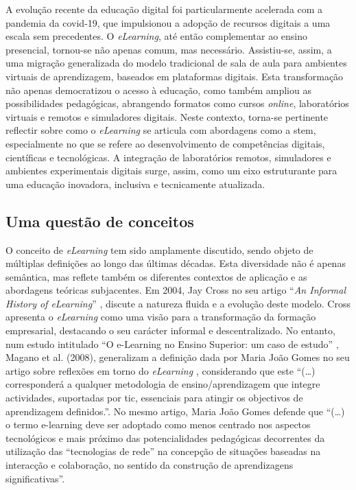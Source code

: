 A evolução recente da educação digital foi particularmente acelerada com a pandemia da \acrshort{covid-19}, que impulsionou a adopção de recursos digitais a uma escala sem precedentes. O \textit{eLearning}, até então complementar ao ensino presencial, tornou-se não apenas comum, mas necessário. Assistiu-se, assim, a uma migração generalizada do modelo tradicional de sala de aula para ambientes virtuais de aprendizagem, baseados em plataformas digitais. Esta transformação não apenas democratizou o acesso à educação, como também ampliou as possibilidades pedagógicas, abrangendo formatos como cursos \textit{online}, laboratórios virtuais e remotos e simuladores digitais. Neste contexto, torna-se pertinente reflectir sobre como o \textit{eLearning} se articula com abordagens como a \acrshort{stem}, especialmente no que se refere ao desenvolvimento de competências digitais, científicas e tecnológicas. A integração de laboratórios remotos, simuladores e ambientes experimentais digitais surge, assim, como um eixo estruturante para uma educação inovadora, inclusiva e tecnicamente 
atualizada.

\subsection{Uma questão de conceitos}
O conceito de \textit{eLearning} tem sido amplamente discutido, sendo objeto de múltiplas definições ao longo das últimas décadas. Esta diversidade não é apenas semântica, mas reflete também os diferentes contextos de aplicação e as abordagens teóricas subjacentes. Em 2004, Jay Cross no seu artigo ``\textit{An Informal History of eLearning}'' \cite{jaycross}, discute a natureza fluida e a evolução deste modelo. Cross apresenta o \textit{eLearning} como uma visão para a transformação da formação empresarial, destacando o seu carácter informal e descentralizado.  No entanto, num estudo intitulado ``O e-Learning no Ensino Superior: um caso de estudo'' \cite{eLearningenssup}, Magano et al. (2008), generalizam a definição dada por Maria João Gomes no seu artigo sobre reflexões em torno do \textit{eLearning} \cite{gomes_e-learning_2005}, considerando que este ``(\ldots) corresponderá a qualquer metodologia de ensino/aprendizagem que integre actividades, suportadas por \acrshort{tic}, essenciais para atingir os objectivos de aprendizagem definidos.''. No mesmo artigo, Maria João Gomes defende que ``(\ldots) o termo e-learning deve ser adoptado como menos centrado nos aspectos tecnológicos e mais próximo das potencialidades pedagógicas decorrentes da utilização das ``tecnologias de rede'' na concepção de situações baseadas na interacção e colaboração, no sentido da construção de aprendizagens significativas''.

